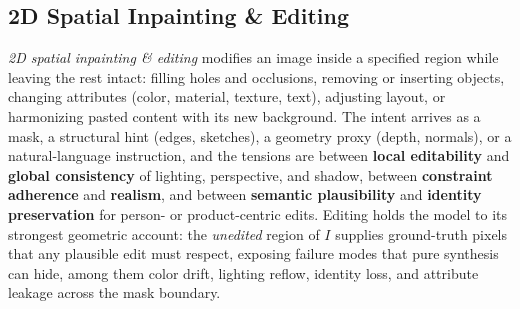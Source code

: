 \subsection{2D Spatial Inpainting \& Editing}
\label{subsec:p3_s8_1_3}

\emph{2D spatial inpainting \& editing} modifies an image inside a specified region while leaving the rest intact: filling holes and occlusions, removing or inserting objects, changing attributes (color, material, texture, text), adjusting layout, or harmonizing pasted content with its new background.
The intent arrives as a mask, a structural hint (edges, sketches), a geometry proxy (depth, normals), or a natural-language instruction, and the tensions are between \textbf{local editability} and \textbf{global consistency} of lighting, perspective, and shadow, between \textbf{constraint adherence} and \textbf{realism}, and between \textbf{semantic plausibility} and \textbf{identity preservation} for person- or product-centric edits.
Editing holds the model to its strongest geometric account: the \emph{unedited} region of $I$ supplies ground-truth pixels that any plausible edit must respect, exposing failure modes that pure synthesis can hide, among them color drift, lighting reflow, identity loss, and attribute leakage across the mask boundary.


